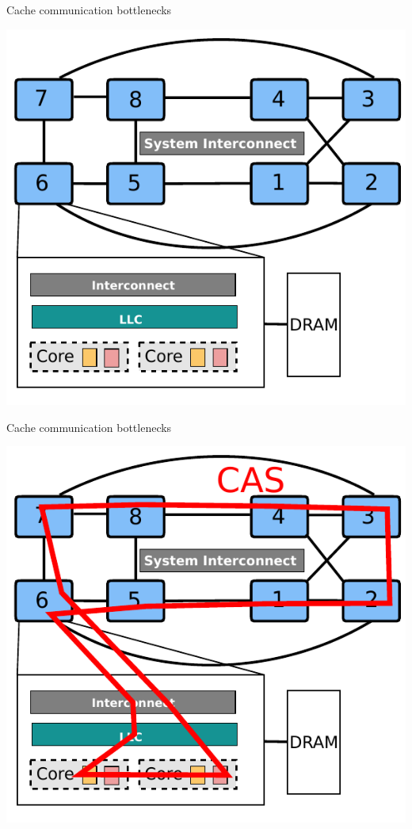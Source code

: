 \documentclass[english]{beamer} %
\begin{document}
\begin{frame}{Cache communication bottlenecks}
\begin{center}
\includegraphics[scale=0.8]{fig/archcache_cas}
\end{center}
\end{frame}

\begin{frame}{Cache communication bottlenecks}
\begin{center}
\includegraphics[scale=0.8]{fig/archcache_cas_1}
\end{center}
\end{frame}
\end{document}
